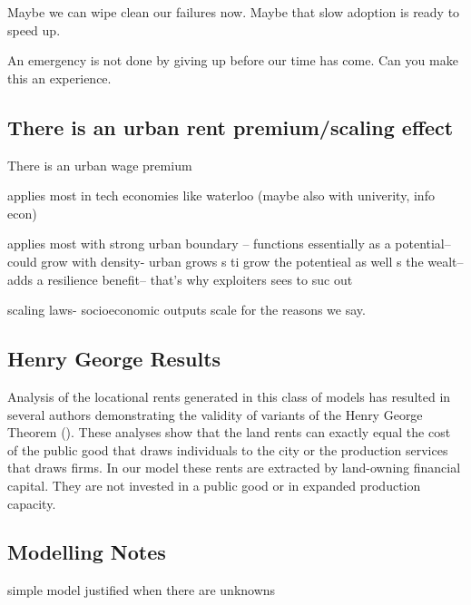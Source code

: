 Maybe we can wipe clean our failures now. 
Maybe that slow adoption is ready to speed up.

An emergency is not done by giving up before our time has come. 
Can you make this an experience. 




\subsection{There is an urban rent premium/scaling effect}
There is an urban wage premium %

applies most in tech economies like waterloo (maybe also with univerity,   info econ)

applies most with strong urban boundary -- functions essentially as a potential-- could grow with density- urban grows s ti grow the potentieal as well s the wealt-- adds a resilience benefit-- that's why exploiters sees to suc out

scaling laws- socioeconomic outputs scale for the reasons we say.


\subsection{Henry George Results}
Analysis of the locational rents generated in this class of models has resulted in several authors demonstrating the validity of variants of the Henry George Theorem (\cite{Arnott-Stiglitz79, Arnott04, BehrensKanemoto14, JohnM.Hartwick1980THGR}). These analyses  show that the land rents can exactly equal the cost of the public good that draws individuals to the city or the production services that draws firms. In our model these rents are extracted by land-owning financial capital. They are not invested in a public good or in expanded production capacity.

\subsection{Modelling Notes}


simple model justified when there are unknowns %


